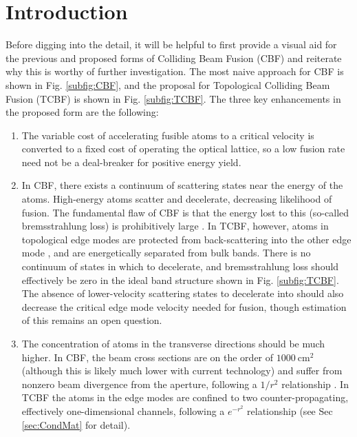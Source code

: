\documentclass[onecolumn,
               superscriptaddress,
               floatfix,
               longbibliography, 
               showkeys,apl]{revtex4-2}
\begin{document}
\maketitle

\section{Introduction}

Before digging into the detail, it will be helpful to first provide a visual aid for the previous and proposed forms of Colliding Beam Fusion (CBF) and reiterate why this is worthy of further investigation. The most naive approach for CBF is shown in Fig. \ref{subfig:CBF}, and the proposal for Topological Colliding Beam Fusion (TCBF) is shown in Fig. \ref{subfig:TCBF}. The three key enhancements in the proposed form are the following:

\begin{enumerate}
  \item The variable cost of accelerating fusible atoms to a critical velocity is converted to a fixed cost of operating the optical lattice, so a low fusion rate need not be a deal-breaker for positive energy yield.
  \item In CBF, there exists a continuum of scattering states near the energy of the atoms. High-energy atoms scatter and decelerate, decreasing likelihood of fusion. The fundamental flaw of CBF is that the energy lost to this (so-called bremsstrahlung loss) is prohibitively large \cite{Ridder1994}. In TCBF, however, atoms in topological edge modes are protected from back-scattering into the other edge mode \cite{RevModPhys.83.1057}, and are energetically separated from bulk bands. There is no continuum of states in which to decelerate, and bremsstrahlung loss should effectively be zero in the ideal band structure shown in Fig. \ref{subfig:TCBF}. The absence of lower-velocity scattering states to decelerate into should also decrease the critical edge mode velocity needed for fusion, though estimation of this remains an open question.
  \item The concentration of atoms in the transverse directions should be much higher. In CBF, the beam cross sections are on the order of $1000~\text{cm}^2$ (although this is likely much lower with current technology) and suffer from nonzero beam divergence from the aperture, following a $1/r^2$ relationship \cite{blewett197xcbf}. In TCBF the atoms in the edge modes are confined to two counter-propagating, effectively one-dimensional channels, following a $e^{-r^2}$ relationship (see Sec \ref{sec:CondMat} for detail).
\end{enumerate}
\end{document}

